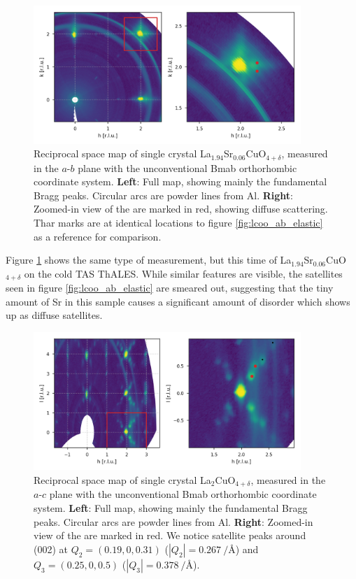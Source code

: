 \begin{figure}
    \centering
    \includegraphics[width=0.9\textwidth]{fig/pdf/lscoo_ab_elastic.png}
    \caption{Reciprocal space map of single crystal La$_{1.94}$Sr$_{0.06}$CuO$_{4+\delta}$, measured in the $a$-$b$ plane with the unconventional Bmab orthorhombic coordinate system. \textbf{Left}: Full map, showing mainly the fundamental Bragg peaks. Circular arcs are powder lines from Al. \textbf{Right}: Zoomed-in view of the are marked in red, showing diffuse scattering. Thar marks are at identical locations to figure \ref{fig:lcoo_ab_elastic} as a reference for comparison.}
    \label{fig:lscoo_ab_elastic}
\end{figure}

Figure \ref{fig:lscoo_ab_elastic} shows the same type of measurement, but this time of La$_{1.94}$Sr$_{0.06}$CuO$_{4+\delta}$ on the cold TAS ThALES. While similar features are visible, the satellites seen in figure \ref{fig:lcoo_ab_elastic} are smeared out, suggesting that the tiny amount of Sr in this sample causes a significant amount of disorder which shows up as diffuse satellites.

\begin{figure}
    \centering
    \includegraphics[width=0.9\textwidth]{fig/pdf/lscoo_ac_elastic.png}
    \caption{Reciprocal space map of single crystal La$_2$CuO$_{4+\delta}$, measured in the $a$-$c$ plane with the unconventional Bmab orthorhombic coordinate system. \textbf{Left}: Full map, showing mainly the fundamental Bragg peaks. Circular arcs are powder lines from Al. \textbf{Right}: Zoomed-in view of the are marked in red. We notice satellite peaks around (002) at $Q_2=(0.19,0,0.31)$ ($|Q_2| = \SI{0.267}{\per\angstrom}$) and $Q_3=(0.25,0,0.5)$ ($|Q_3| = \SI{0.378}{\per\angstrom}$).}
    \label{fig:lscoo_ac_elastic}
\end{figure}

